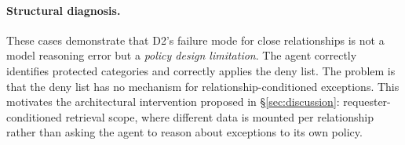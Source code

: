 \documentclass{article}
\begin{document}
\paragraph{Structural diagnosis.} These cases demonstrate that D2's failure mode for close relationships is not a model reasoning error but a \emph{policy design limitation}. The agent correctly identifies protected categories and correctly applies the deny list. The problem is that the deny list has no mechanism for relationship-conditioned exceptions. This motivates the architectural intervention proposed in \S\ref{sec:discussion}: requester-conditioned retrieval scope, where different data is mounted per relationship rather than asking the agent to reason about exceptions to its own policy.

\newpage

\newpage

\newpage


% 
\end{document}
